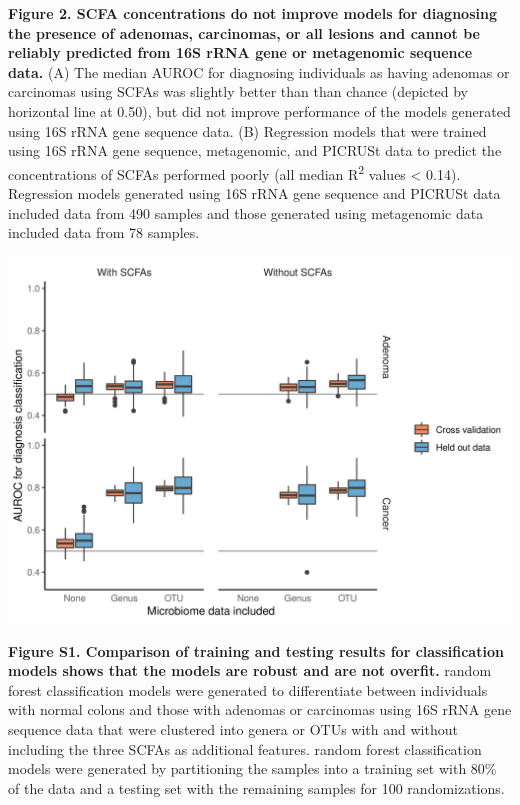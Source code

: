\documentclass[11pt,]{article}
\begin{document}
\textbf{Figure 2. SCFA concentrations do not improve models for
diagnosing the presence of adenomas, carcinomas, or all lesions and
cannot be reliably predicted from 16S rRNA gene or metagenomic sequence
data.} (A) The median AUROC for diagnosing individuals as having
adenomas or carcinomas using SCFAs was slightly better than than chance
(depicted by horizontal line at 0.50), but did not improve performance
of the models generated using 16S rRNA gene sequence data. (B)
Regression models that were trained using 16S rRNA gene sequence,
metagenomic, and PICRUSt data to predict the concentrations of SCFAs
performed poorly (all median R\textsuperscript{2} values \textless{}
0.14). Regression models generated using 16S rRNA gene sequence and
PICRUSt data included data from 490 samples and those generated using
metagenomic data included data from 78 samples.

\newpage

\includegraphics{figure_s1.png}

\textbf{Figure S1. Comparison of training and testing results for
classification models shows that the models are robust and are not
overfit.} random forest classification models were generated to
differentiate between individuals with normal colons and those with
adenomas or carcinomas using 16S rRNA gene sequence data that were
clustered into genera or OTUs with and without including the three SCFAs
as additional features. random forest classification models were
generated by partitioning the samples into a training set with 80\% of
the data and a testing set with the remaining samples for 100
randomizations.

\newpage
\end{document}
